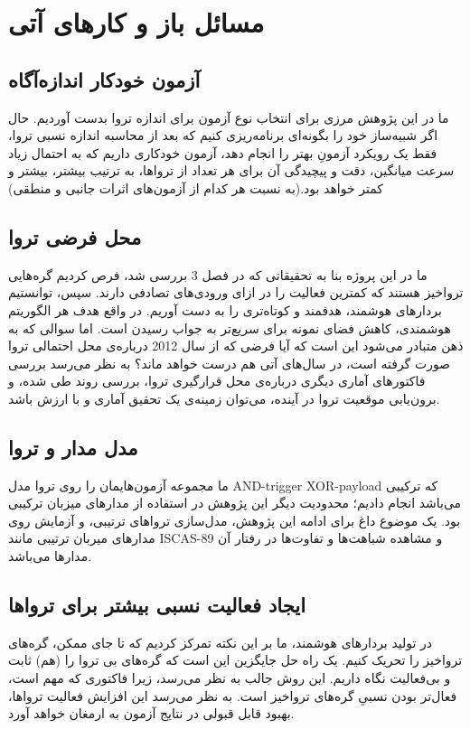 \section{مسائل باز و کارهای آتی}

\subsection{آزمون خودکار اندازه‌آگاه}
ما در این پژوهش مرزی برای انتخاب نوع آزمون برای اندازه تروا بدست آوردیم. حال اگر شبیه‌ساز خود را بگونه‌ای برنامه‌ریزی کنیم که بعد از محاسبه اندازه نسبی تروا، فقط یک رویکرد آزمونِ بهتر را انجام دهد، آزمون خودکاری داریم که به احتمال زیاد سرعت میانگین، دقت و پیچیدگی آن برای هر تعداد از تروا‌ها، به ترتیب بیشتر، بیشتر و کمتر خواهد بود.(به نسبت هر کدام از آزمون‌های اثرات جانبی و منطقی)
\subsection{محل فرضی تروا}
ما در این پروژه بنا به تحقیقاتی که در فصل 3 بررسی شد، فرص کردیم گره‌هایی تروا‌خیز هستند که کمترین فعالیت را در ازای ورودی‌های تصادفی دارند. سپس، توانستیم بردارهای هوشمند، هدفمند و کوتاه‌تری را به دست آوریم. در واقع هدف هر الگوریتم هوشمندی، کاهش فضای نمونه برای سریع‌تر به جواب رسیدن است.  اما سوالی که به ذهن متبادر می‌شود این است که آیا فرضی که از سال 2012 درباره‌ی محل احتمالی تروا صورت گرفته است، در سال‌های آتی هم درست خواهد ماند؟ به نظر می‌رسد بررسی فاکتورهای آماری دیگری درباره‌ی محل قرارگیری تروا، بررسی روند طی شده، و برون‌یابی موقعیت تروا در آینده، می‌توان زمینه‌ی یک تحقیق آماری و با ارزش باشد.
\subsection{مدل مدار و تروا}
ما مجموعه آزمون‌هایمان را روی تروا مدل AND-trigger XOR-payload که ترکیبی می‌باشد انجام دادیم؛ محدودیت دیگر این پژوهش در استفاده از مدارهای میزبان ترکیبی بود. یک موضوع داغ برای ادامه این پژوهش، مدل‌سازی تروا‌های ترتیبی، و آزمایش روی مدارهای میربان ترتیبی مانند ISCAS-89 و مشاهده شباهت‌ها و تفاوت‌ها در رفتار آن مدارها می‌باشد.
\subsection{ایجاد فعالیت نسبی بیشتر برای تروا‌ها}
در تولید بردارهای هوشمند، ما بر این نکته تمرکز کردیم که تا جای ممکن، گره‌های تروا‌خیز را تحریک کنیم. یک راه حل جایگزین این است که گره‌های بی تروا را (هم) ثابت و بی‌فعالیت نگاه داریم. این روش جالب به نظر می‌رسد، زیرا فاکتوری که مهم است، فعال‌تر بودن نسبیِ گره‌های تروا‌خیز است. به نظر می‌رسد این افزایش فعالیت تروا‌ها، بهبود قابل قبولی در نتایج آزمون به ارمغان خواهد آورد.
